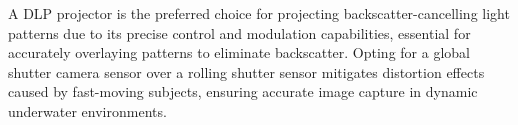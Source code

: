 A DLP projector is the preferred choice for projecting backscatter-cancelling light patterns due to its precise control and modulation capabilities, essential for accurately overlaying patterns to eliminate backscatter. Opting for a global shutter camera sensor over a rolling shutter sensor mitigates distortion effects caused by fast-moving subjects, ensuring accurate image capture in dynamic underwater environments.
